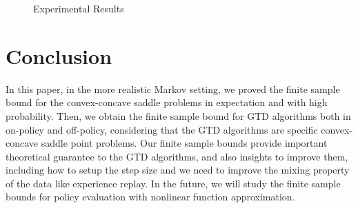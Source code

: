\documentclass[twoside,11pt]{article}
\numberwithin{equation}{section}
\begin{document}
\begin{figure}[h]
		\label{Fig1}	
		\caption{Experimental Results  }		
	\end{figure}	
	\section{Conclusion}
	In this paper, in the more realistic Markov setting, we proved the finite sample bound for the convex-concave saddle problems  in expectation and with high probability. Then, we obtain the finite sample bound for GTD algorithms both in on-policy and off-policy, considering that the GTD algorithms are specific convex-concave saddle point problems. Our finite sample bounds provide important theoretical guarantee to the GTD algorithms, and also insights to improve them, including how to setup the step size and we need to improve the mixing property of the data like experience replay. In the future, we will study the finite sample bounds for policy evaluation with nonlinear function approximation.


 
	
	
	


\end{document}
